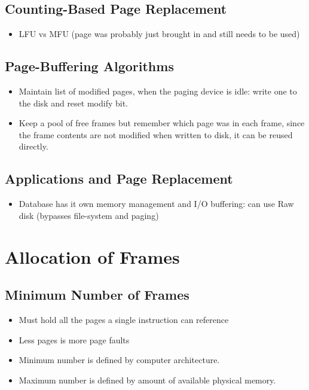 \documentclass[10pt]{report}
\begin{document}
		\subsection{Counting-Based Page Replacement}
			\begin{itemize}
				\item LFU vs MFU (page was probably just brought in and still needs to be used)
			\end{itemize}

		\subsection{Page-Buffering Algorithms}
			\begin{itemize}
				\item Maintain list of modified pages, when the paging device is idle: write one to the disk and reset modify bit.
				\item Keep a pool of free frames but remember which page was in each frame, since the frame contents are not modified when written to disk, it can be reused directly.
			\end{itemize}

		\subsection{Applications and Page Replacement}
			\begin{itemize}
				\item Database has it own memory management and I/O buffering: can use Raw disk (bypasses file-system and paging)
			\end{itemize}

	\section{Allocation of Frames}
		\subsection{Minimum Number of Frames}
			\begin{itemize}
				\item Must hold all the pages a single instruction can reference
				\item Less pages is more page faults
				\item Minimum number is defined by computer architecture.
				\item Maximum number is defined by amount of available physical memory.
			\end{itemize}
\end{document}
